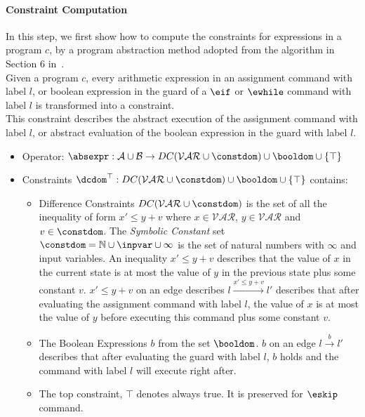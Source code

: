 \paragraph{Constraint Computation}
In this step, we first show how to compute the constraints for expressions in a program $c$,
by a program abstraction method adopted from the
algorithm in Section 6 in~\cite{sinn2017complexity}.
\\
Given a program $c$,
every arithmetic expression in an assignment command with label $l$,
or boolean expression in the guard of a $\eif$ or $\ewhile$ command with label $l$
is transformed into a constraint.
\\
This constraint describes the abstract execution of the assignment command with label $l$,
or abstract evaluation of the boolean expression in the guard with label $l$.

\begin{itemize}
\item Operator: $\absexpr : \mathcal{A} \cup \mathcal{B} \to DC(\mathcal{VAR}  \cup \constdom)\cup \booldom \cup \{\top\}$
%
\item Constraints $\dcdom^{\top}: DC(\mathcal{VAR}  \cup \constdom) \cup \booldom\cup \{\top\}$  contains:
%
\begin{itemize}
\item Difference Constraints $DC(\mathcal{VAR}  \cup \constdom)$ is the set of all the inequality of
form $x' \leq y + v$ where $x \in \mathcal{VAR} $, 
$y \in \mathcal{VAR}$ and $v \in \constdom$.
The \emph{Symbolic Constant} set $\constdom = \mathbb{N} \cup \inpvar \cup{\infty}$
is the set of natural numbers with $\infty$ and input variables.
An inequality $x' \leq y + v$ describes that the value of $x$ in the current state is
at most the value of $y$ in the previous state plus some constant $v$.
$x' \leq y + v$ on an edge describes $l \xrightarrow{x' \leq y + v} l'$ describes
that after evaluating the assignment command with label $l$, the value of $x$ is
at most the value of $y$ before executing this command plus some constant $v$.
%
\item The Boolean Expressions $b$ from the set $\booldom$.
$b$ on an edge $l \xrightarrow{b} l'$ describes
that after evaluating the guard with label $l$,
$b$ holds and the command with label $l$ will execute right after.
%
\item The top constraint, $\top$ denotes always true. It is preserved for $\eskip$ command.
\end{itemize}
\end{itemize}

